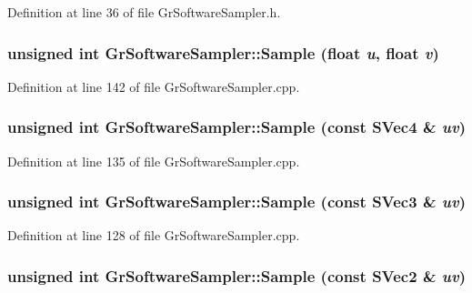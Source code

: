 Definition at line 36 of file GrSoftwareSampler.h.\hypertarget{class_gr_software_sampler_d84404a8d6e203fa41d00fa24cdd61a6}{
\subsubsection[{Sample}]{\setlength{\rightskip}{0pt plus 5cm}unsigned int GrSoftwareSampler::Sample (float {\em u}, \/  float {\em v})}}
\label{class_gr_software_sampler_d84404a8d6e203fa41d00fa24cdd61a6}




Definition at line 142 of file GrSoftwareSampler.cpp.\hypertarget{class_gr_software_sampler_3ac75deb852297d65b6b8a25130f6e33}{
\subsubsection[{Sample}]{\setlength{\rightskip}{0pt plus 5cm}unsigned int GrSoftwareSampler::Sample (const {\bf SVec4} \& {\em uv})}}
\label{class_gr_software_sampler_3ac75deb852297d65b6b8a25130f6e33}




Definition at line 135 of file GrSoftwareSampler.cpp.\hypertarget{class_gr_software_sampler_181ecd64d3462e41efd6b30d8ea48477}{
\subsubsection[{Sample}]{\setlength{\rightskip}{0pt plus 5cm}unsigned int GrSoftwareSampler::Sample (const {\bf SVec3} \& {\em uv})}}
\label{class_gr_software_sampler_181ecd64d3462e41efd6b30d8ea48477}




Definition at line 128 of file GrSoftwareSampler.cpp.\hypertarget{class_gr_software_sampler_ed7049f3a7788c85da845b744ff85e0d}{
\subsubsection[{Sample}]{\setlength{\rightskip}{0pt plus 5cm}unsigned int GrSoftwareSampler::Sample (const {\bf SVec2} \& {\em uv})}}
\label{class_gr_software_sampler_ed7049f3a7788c85da845b744ff85e0d}




